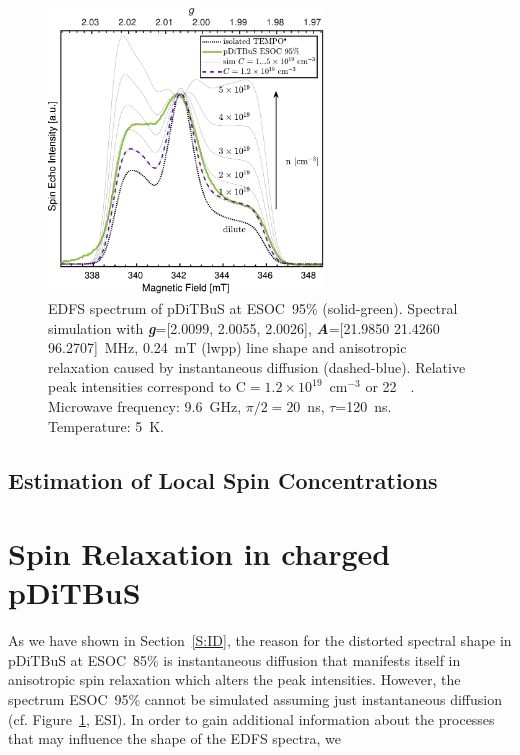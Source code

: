 \begin{figure}[ht!]
  \centering
	\includegraphics[width=0.65\textwidth]{./pulse/figures/Figure_S24.pdf}
	\caption{EDFS spectrum of pDiTBuS at ESOC~95\% (solid-green). Spectral simulation with \textit{\textbf{g}}=[2.0099, 2.0055, 2.0026], \textit{\textbf{A}}=[21.9850 21.4260 96.2707]~MHz, 0.24~mT (lwpp)  line shape and anisotropic relaxation caused by instantaneous diffusion (dashed-blue). Relative peak intensities correspond to C$=1.2\times10^{19}$~cm$^{-3}$ or 22~\si{\milli\Molar}. Microwave frequency: 9.6~GHz, $\pi/2=20$~ns, $\tau$=120~ns. Temperature: 5~K.}
	\label{fig:Figure_S_SIM_FSE_SOC95_ID}
\end{figure}

\newpage




\subsection{Estimation of Local Spin Concentrations}



\section{Spin Relaxation in charged pDiTBuS}
\label{S:RELAX_TIMES}

As we have shown in Section~\ref{S:ID}, the reason for the distorted spectral shape in pDiTBuS at ESOC~85\% is instantaneous diffusion that manifests itself in anisotropic spin relaxation which alters the  peak intensities. However, the spectrum  ESOC~95\% cannot be simulated assuming just instantaneous diffusion (cf. Figure~\ref{fig:Figure_S_SIM_FSE_SOC95_ID}, ESI). In order to gain additional information about the processes that may influence the shape of the EDFS spectra, we \\

